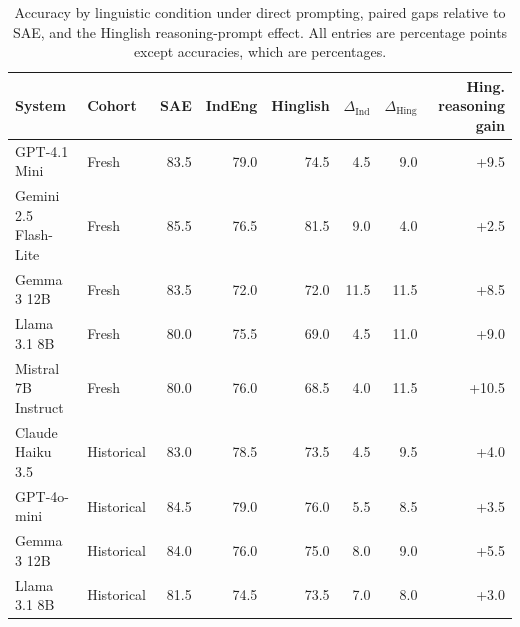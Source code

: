 \begin{table}[t]
\centering
\caption{Accuracy by linguistic condition under direct prompting, paired gaps relative to SAE, and the Hinglish reasoning-prompt effect. All entries are percentage points except accuracies, which are percentages.}
\label{tab:accuracy-main}
\small
\setlength{\tabcolsep}{4pt}
\begin{tabular}{llrrrrrr}
\toprule
System & Cohort & SAE & IndEng & Hinglish & $\Delta_{\mathrm{Ind}}$ & $\Delta_{\mathrm{Hing}}$ & Hing. reasoning gain \\
\midrule
GPT-4.1 Mini & Fresh & 83.5 & 79.0 & 74.5 & 4.5 & 9.0 & +9.5 \\
Gemini 2.5 Flash-Lite & Fresh & 85.5 & 76.5 & 81.5 & 9.0 & 4.0 & +2.5 \\
Gemma 3 12B & Fresh & 83.5 & 72.0 & 72.0 & 11.5 & 11.5 & +8.5 \\
Llama 3.1 8B & Fresh & 80.0 & 75.5 & 69.0 & 4.5 & 11.0 & +9.0 \\
Mistral 7B Instruct & Fresh & 80.0 & 76.0 & 68.5 & 4.0 & 11.5 & +10.5 \\
\addlinespace
Claude Haiku 3.5 & Historical & 83.0 & 78.5 & 73.5 & 4.5 & 9.5 & +4.0 \\
GPT-4o-mini & Historical & 84.5 & 79.0 & 76.0 & 5.5 & 8.5 & +3.5 \\
Gemma 3 12B & Historical & 84.0 & 76.0 & 75.0 & 8.0 & 9.0 & +5.5 \\
Llama 3.1 8B & Historical & 81.5 & 74.5 & 73.5 & 7.0 & 8.0 & +3.0 \\
\bottomrule
\end{tabular}
\end{table}
